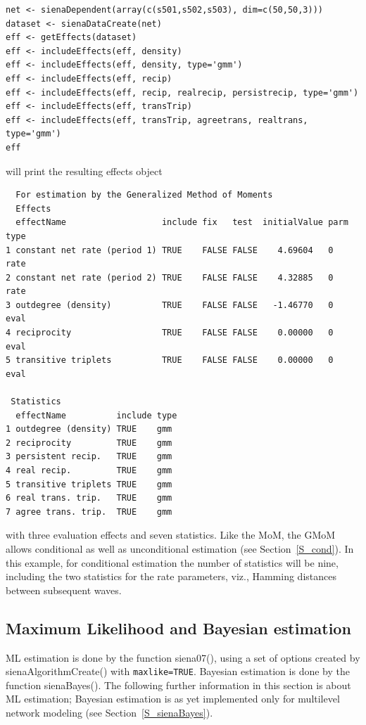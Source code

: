 \documentclass[a4paper,fleqn,11pt]{article}
\newcommand{\+}{\, + \,}
\newcommand{\sfn}[1]{\textsf{#1}}
\begin{document}
\begin{verbatim}
net <- sienaDependent(array(c(s501,s502,s503), dim=c(50,50,3)))
dataset <- sienaDataCreate(net)
eff <- getEffects(dataset)
eff <- includeEffects(eff, density)
eff <- includeEffects(eff, density, type='gmm')
eff <- includeEffects(eff, recip)
eff <- includeEffects(eff, recip, realrecip, persistrecip, type='gmm')
eff <- includeEffects(eff, transTrip)
eff <- includeEffects(eff, transTrip, agreetrans, realtrans, type='gmm')
eff
\end{verbatim}
will print the resulting effects object
\begin{verbatim}
  For estimation by the Generalized Method of Moments
  Effects
  effectName                   include fix   test  initialValue parm type
1 constant net rate (period 1) TRUE    FALSE FALSE    4.69604   0    rate
2 constant net rate (period 2) TRUE    FALSE FALSE    4.32885   0    rate
3 outdegree (density)          TRUE    FALSE FALSE   -1.46770   0    eval
4 reciprocity                  TRUE    FALSE FALSE    0.00000   0    eval
5 transitive triplets          TRUE    FALSE FALSE    0.00000   0    eval

 Statistics
  effectName          include type
1 outdegree (density) TRUE    gmm
2 reciprocity         TRUE    gmm
3 persistent recip.   TRUE    gmm
4 real recip.         TRUE    gmm
5 transitive triplets TRUE    gmm
6 real trans. trip.   TRUE    gmm
7 agree trans. trip.  TRUE    gmm
\end{verbatim}
with three evaluation effects and seven statistics.
Like the MoM, the GMoM allows conditional as well as unconditional
estimation (see Section~\ref{S_cond}).
In this example, for conditional estimation the number
of statistics will be nine, including the two statistics
for the rate parameters, viz., Hamming distances
between subsequent waves.

\subsection{Maximum Likelihood and Bayesian estimation}
\label{S_ML}
\label{S_Bayes}

ML estimation is done by the function \sfn{siena07()}, using a set of options
created by \sfn{sienaAlgorithmCreate()} with \texttt{maxlike=TRUE}.
Bayesian estimation is done by the function \sfn{sienaBayes()}.
The following further information in this section is about ML estimation;
Bayesian estimation is as yet implemented only for multilevel network modeling
(see Section~\ref{S_sienaBayes}).
\end{document}
